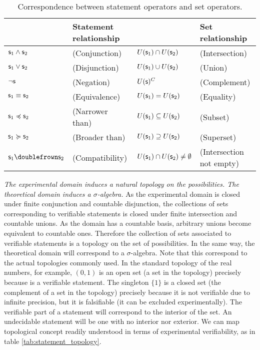 \documentclass[twocolumn]{article}
\begin{document}
\begin{table*}[h]
	\centering
	\begin{tabular}{p{} p{} p{} p{}}
		& Statement relationship & & Set relationship  \\ 
		\hline 
		$\mathsf{s}_1 \wedge \mathsf{s}_2$ & (Conjunction) & $U(\mathsf{s}_1) \cap U(\mathsf{s}_2)$ & (Intersection) \\ 
		$\mathsf{s}_1 \vee \mathsf{s}_2$ & (Disjunction) & $U(\mathsf{s}_1) \cup U(\mathsf{s}_2)$ & (Union) \\ 
		$\neg \mathsf{s}$ & (Negation) & $U(\mathsf{s})^C$ & (Complement) \\ 
		$\mathsf{s}_1 \equiv \mathsf{s}_2$ & (Equivalence) & $U(\mathsf{s}_1) = U(\mathsf{s}_2)$ & (Equality) \\ 
		$\mathsf{s}_1 \preccurlyeq \mathsf{s}_2$ & (Narrower than) & $U(\mathsf{s}_1) \subseteq U(\mathsf{s}_2)$ & (Subset) \\ 
		$\mathsf{s}_1 \succcurlyeq \mathsf{s}_2$ & (Broader than) & $U(\mathsf{s}_1) \supseteq U(\mathsf{s}_2)$ & (Superset) \\ 
		$\stmt_1 \comp \stmt_2$ & (Compatibility) & $U(\mathsf{s}_1) \cap U(\mathsf{s}_2) \neq \emptyset$ & (Intersection not empty)
	\end{tabular} 
	\caption{Correspondence between statement operators and set operators.}\label{tab:statement_set}
\end{table*}

\textit{The experimental domain induces a natural topology on the possibilities. The theoretical domain induces a $\sigma$-algebra.} As the experimental domain is closed under finite conjunction and countable disjunction, the collections of sets corresponding to verifiable statements is closed under finite intersection and countable unions. As the domain has a countable basis, arbitrary unions become equivalent to countable ones. Therefore the collection of sets associated to verifiable statements is a topology on the set of possibilities. In the same way, the theoretical domain will correspond to a $\sigma$-algebra. Note that this correspond to the actual topologies commonly used. In the standard topology of the real numbers, for example, $(0,1)$ is an open set (a set in the topology) precisely because  is a verifiable statement. The singleton $\{1\}$ is a closed set (the complement of a set in the topology) precisely because it is not verifiable due to infinite precision, but it is falsifiable (it can be excluded experimentally). The verifiable part of a statement will correspond to the interior of the set. An undecidable statement will be one with no interior nor exterior. We can map topological concept readily understood in terms of experimental verifiability, as in table \ref{tab:statement_topology}.
\end{document}
